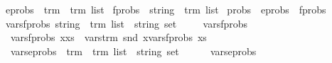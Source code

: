 \begin{isabellebody}
\ eprobs\ {\isacharequal}{\kern0pt}\ {\isachardoublequoteopen}{\isacharparenleft}{\kern0pt}{\isacharparenleft}{\kern0pt}trm\ {\isasymtimes}\ trm{\isacharparenright}{\kern0pt}\ list{\isacharparenright}{\kern0pt}{\isachardoublequoteclose}\isanewline
{}\isamarkupfalse%
\ fprobs\ {\isacharequal}{\kern0pt}\ {\isachardoublequoteopen}{\isacharparenleft}{\kern0pt}{\isacharparenleft}{\kern0pt}string\ {\isasymtimes}\ trm{\isacharparenright}{\kern0pt}\ list{\isacharparenright}{\kern0pt}{\isachardoublequoteclose}\isanewline
{}\isamarkupfalse%
\ probs\ {\isacharequal}{\kern0pt}\ {\isachardoublequoteopen}eprobs\ {\isasymtimes}\ fprobs{\isachardoublequoteclose}\isanewline
\isanewline
{}\isamarkupfalse%
\ vars{\isacharunderscore}{\kern0pt}fprobs{\isacharcolon}{\kern0pt}{\isacharcolon}{\kern0pt}\ {\isachardoublequoteopen}{\isacharparenleft}{\kern0pt}{\isacharparenleft}{\kern0pt}string\ {\isasymtimes}\ trm{\isacharparenright}{\kern0pt}\ list{\isacharparenright}{\kern0pt}\ {\isasymRightarrow}\ {\isacharparenleft}{\kern0pt}string\ set{\isacharparenright}{\kern0pt}{\isachardoublequoteclose}\isanewline
\ \ \isanewline
\ \ {\isachardoublequoteopen}vars{\isacharunderscore}{\kern0pt}fprobs\ {\isacharbrackleft}{\kern0pt}{\isacharbrackright}{\kern0pt}\ {\isacharequal}{\kern0pt}\ {\isacharbraceleft}{\kern0pt}{\isacharbraceright}{\kern0pt}{\isachardoublequoteclose}\ {\isacharbar}{\kern0pt}\isanewline
\ \ {\isachardoublequoteopen}vars{\isacharunderscore}{\kern0pt}fprobs\ {\isacharparenleft}{\kern0pt}x{\isacharhash}{\kern0pt}xs{\isacharparenright}{\kern0pt}\ {\isacharequal}{\kern0pt}\ {\isacharparenleft}{\kern0pt}vars{\isacharunderscore}{\kern0pt}trm\ {\isacharparenleft}{\kern0pt}snd\ x{\isacharparenright}{\kern0pt}{\isacharparenright}{\kern0pt}{\isasymunion}{\isacharparenleft}{\kern0pt}vars{\isacharunderscore}{\kern0pt}fprobs\ xs{\isacharparenright}{\kern0pt}{\isachardoublequoteclose}\isanewline
\isanewline
{}\isamarkupfalse%
\ \ vars{\isacharunderscore}{\kern0pt}eprobs\ {\isacharcolon}{\kern0pt}{\isacharcolon}{\kern0pt}\ {\isachardoublequoteopen}{\isacharparenleft}{\kern0pt}{\isacharparenleft}{\kern0pt}trm\ {\isasymtimes}\ trm{\isacharparenright}{\kern0pt}\ list{\isacharparenright}{\kern0pt}\ {\isasymRightarrow}\ {\isacharparenleft}{\kern0pt}string\ set{\isacharparenright}{\kern0pt}{\isachardoublequoteclose}\isanewline
\ \ \isanewline
\ \ \ {\isachardoublequoteopen}vars{\isacharunderscore}{\kern0pt}eprobs\ {\isacharbrackleft}{\kern0pt}{\isacharbrackright}{\kern0pt}\ {\isacharequal}{\kern0pt}\ {\isacharbraceleft}{\kern0pt}{\isacharbraceright}{\kern0pt}{\isachardoublequoteclose}\ {\isacharbar}{\kern0pt}\isanewline

\end{isabellebody}
